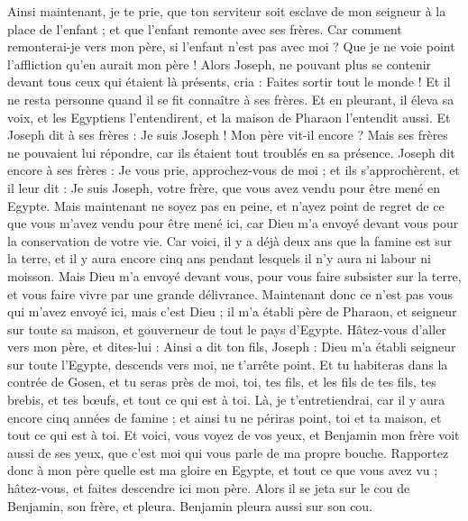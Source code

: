 \begin{multicols}{2}
Ainsi maintenant, je te prie, que ton serviteur soit esclave de mon seigneur à la place de l'enfant ; et que l'enfant remonte avec ses frères.
Car comment remonterai-je vers mon père, si l'enfant n'est pas avec moi ? Que je ne voie point l'affliction qu'en aurait mon père !
\VerseOne{}Alors Joseph, ne pouvant plus se contenir devant tous ceux qui étaient là présents, cria : Faites sortir tout le monde ! Et il ne resta personne quand il se fit connaître à ses frères.
Et en pleurant, il éleva sa voix, et les Egyptiens l'entendirent, et la maison de Pharaon l'entendit aussi.
Et Joseph dit à ses frères : Je suis Joseph ! Mon père vit-il encore ? Mais ses frères ne pouvaient lui répondre, car ils étaient tout troublés en sa présence.
Joseph dit encore à ses frères : Je vous prie, approchez-vous de moi ; et ils s'approchèrent, et il leur dit : Je suis Joseph, votre frère, que vous avez vendu pour être mené en Egypte.
Mais maintenant ne soyez pas en peine, et n'ayez point de regret de ce que vous m'avez vendu pour être mené ici, car Dieu m'a envoyé devant vous pour la conservation de votre vie.
Car voici, il y a déjà deux ans que la famine est sur la terre, et il y aura encore cinq ans pendant lesquels il n'y aura ni labour ni moisson.
Mais Dieu m'a envoyé devant vous, pour vous faire subsister sur la terre, et vous faire vivre par une grande délivrance.
Maintenant donc ce n'est pas vous qui m'avez envoyé ici, mais c'est Dieu ; il m'a établi père de Pharaon, et seigneur sur toute sa maison, et gouverneur de tout le pays d'Egypte.
Hâtez-vous d'aller vers mon père, et dites-lui : Ainsi a dit ton fils, Joseph : Dieu m'a établi seigneur sur toute l'Egypte, descends vers moi, ne t'arrête point.
Et tu habiteras dans la contrée de Gosen, et tu seras près de moi, toi, tes fils, et les fils de tes fils, tes brebis, et tes bœufs, et tout ce qui est à toi.
Là, je t'entretiendrai, car il y aura encore cinq années de famine ; et ainsi tu ne périras point, toi et ta maison, et tout ce qui est à toi.
Et voici, vous voyez de vos yeux, et Benjamin mon frère voit aussi de ses yeux, que c'est moi qui vous parle de ma propre bouche.
Rapportez donc à mon père quelle est ma gloire en Egypte, et tout ce que vous avez vu ; hâtez-vous, et faites descendre ici mon père.
Alors il se jeta sur le cou de Benjamin, son frère, et pleura. Benjamin pleura aussi sur son cou.

\end{multicols}
